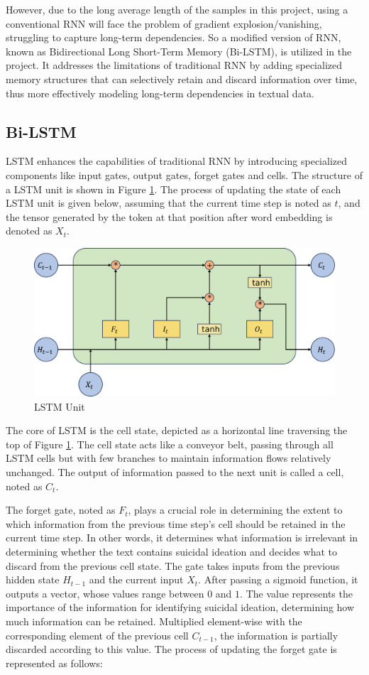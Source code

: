 \documentclass[ %
                    author={Bocheng Wang},
                supervisor={Dr. Qiang Liu},
                    degree={MSc},
                     title={A Research on Identification of Suicide Ideation in Texts with Multiple Models},
                      type={},
                      year={2024}]{dissertation}
\begin{document}
However, due to the long average length of the samples in this project, using a conventional RNN will face the problem of gradient explosion/vanishing, struggling to capture long-term dependencies. So a modified version of RNN, known as Bidirectional Long Short-Term Memory (Bi-LSTM), is utilized in the project. It addresses the limitations of traditional RNN by adding specialized memory structures that can selectively retain and discard information over time, thus more effectively modeling long-term dependencies in textual data.

\subsection{Bi-LSTM}
\noindent
LSTM enhances the capabilities of traditional RNN by introducing specialized components like input gates, output gates, forget gates and cells. The structure of a LSTM unit is shown in Figure \ref{fig:lstm}. The process of updating the state of each LSTM unit is given below, assuming that the current time step is noted as $t$, and the tensor generated by the token at that position after word embedding is denoted as $X_t$.

\begin{figure}[h]
      \centering
      \includegraphics[width=0.7\linewidth]{../img/lstm.eps}
      \caption{LSTM Unit}
      \label{fig:lstm}
\end{figure}

The core of LSTM is the cell state, depicted as a horizontal line traversing the top of Figure \ref{fig:lstm}. The cell state acts like a conveyor belt, passing through all LSTM cells but with few branches to maintain information flows relatively unchanged. The output of information passed to the next unit is called a cell, noted as $C_t$.

The forget gate, noted as $F_t$, plays a crucial role in determining the extent to which information from the previous time step's cell should be retained in the current time step. In other words, it determines what information is irrelevant in determining whether the text contains suicidal ideation and decides what to discard from the previous cell state. The gate takes inputs from the previous hidden state $H_{t-1}$ and the current input $X_t$. After passing a sigmoid function, it outputs a vector, whose values range between $0$ and $1$. The value represents the importance of the information for identifying suicidal ideation, determining how much information can be retained. Multiplied element-wise with the corresponding element of the previous cell $C_{t-1}$, the information is partially discarded according to this value. The process of updating the forget gate is represented as follows:
\end{document}
